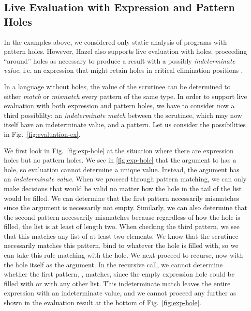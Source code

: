 \subsection{Live Evaluation with Expression and Pattern Holes}
\label{sec:hazel-live-eval}
In the examples above, we considered only {static analysis} of programs with pattern holes.
However, Hazel also supports live evaluation with holes, proceeding ``around'' holes
as necessary to produce a result with a possibly \emph{indeterminate value}, i.e. an expression that might retain holes in critical elimination positions \cite{DBLP:journals/pacmpl/OmarVCH19}.%

In a language without holes, the value of the scrutinee can be determined to either \emph{match} or \emph{mismatch} every pattern of the same type.
In order to support live evaluation with both expression and pattern holes, we have to consider now a third possiblilty: an \emph{indeterminate match} between the scrutinee, which may now itself have an indeterminate value, and a pattern. Let us consider the possibilities in Fig.~\ref{fig:evaluation-ex}. 

We first look in Fig.~\ref{fig:exp-hole} at the situation where there are expression holes but no pattern holes. 
We see in \autoref{fig:exp-hole} that the argument to  has a hole, so evaluation cannot determine a unique value. Instead,
the argument has an \emph{indeterminate value}. 
When we proceed through pattern matching, we can only make decisions that would be valid no matter how the hole in the tail of the list
would be filled. 
We can determine that the first pattern necessarily mismatches since the argument is necessarily not empty. 
Similarly, we can also determine that the second pattern necessarily mismatches because regardless of how the hole is filled, the list is at least of length two. 
When checking the third pattern, we see that this matches any list of at least two elements.
We know that the scrutinee necessarily matches this pattern, bind  to whatever the hole is filled with, so we can take this rule matching  with the hole. We next proceed to recurse, now with the hole itself as the argument. In the recursive call, we cannot determine whether the first pattern, \li{[]}, matches, since the empty expression hole could be filled with \li{[]} or with any other list. This indeterminate match leaves the entire  expression with an indeterminate value, and we cannot proceed any further as shown in the
evaluation result at the bottom of Fig.~\ref{fig:exp-hole}.

